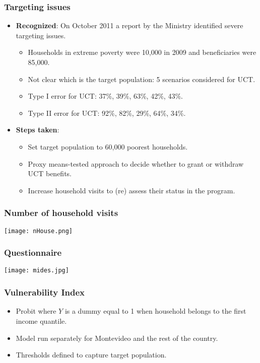 \documentclass{beamer}
\begin{document}
\begin{frame}
\frametitle{Targeting issues}
\begin{itemize}
\item \textbf{Recognized}: On October 2011 a report by the Ministry identified severe targeting issues.
\begin{itemize}
\item Households in extreme poverty were 10,000 in 2009 and beneficiaries were 85,000.
\item Not clear which is the target population: 5 scenarios considered for UCT.
\item Type I error for UCT: 37\%, 39\%, 63\%, 42\%, 43\%.
\item Type II error for UCT: 92\%, 82\%, 29\%, 64\%, 34\%.
\end{itemize}
\item \textbf{Steps taken}:
\begin{itemize}
\item Set target population to 60,000 poorest households.
\item Proxy means-tested approach to decide whether to grant or withdraw UCT benefits.
\item Increase household visits to (re) assess their status in the program.
\end{itemize}	
\end{itemize}
\end{frame}

\begin{frame}
\frametitle{Number of household visits}
\begin{center}
\texttt{[image: nHouse.png]}
\label{nHouse}
\end{center}
\end{frame}

\begin{frame}
\frametitle{Questionnaire}
\begin{center}
\texttt{[image: mides.jpg]}
\label{mides}
\end{center}
\end{frame}

\begin{frame}
\frametitle{Vulnerability Index}
\begin{itemize}
\item Probit where $Y$ is a dummy equal to 1 when household belongs to the first income quantile.
\item Model run separately for Montevideo and the rest of the country.
\item Thresholds defined to capture target population.	
\end{itemize}
\end{frame}
\end{document}
